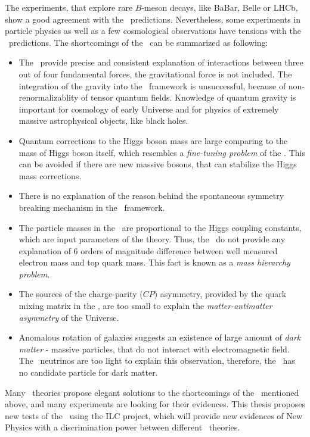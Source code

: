 The experiments, that explore rare $B$-meson decays, like BaBar, Belle or LHCb, show a good agreement with the \sm\ predictions. 
Nevertheless, some experiments in particle physics as well as a few cosmological observations have tensions with the \sm\ predictions.
The shortcomings of the \sm\ can be summarized as following:
\begin{itemize}
\item The \sm\ provide precise and consistent explanation of interactions between three out of four fundamental forces, the gravitational force is not included. The integration of the gravity into the \sm\ framework is unsuccessful, because of non-renormalizablity of tensor quantum fields. Knowledge of quantum gravity is important for cosmology of early Universe and for physics of extremely massive astrophysical objects, like black holes.
\item Quantum corrections to the Higgs boson mass are large comparing to the mass of Higgs boson itself, which resembles a \textit{fine-tuning problem} of the \sm. This can be avoided if there are new massive bosons, that can stabilize the Higgs mass corrections.
\item There is no explanation of the reason behind the spontaneous symmetry breaking mechanism in the \sm\ framework. 

\item The particle masses in the \sm\ are proportional to the Higgs coupling constants, which are input parameters of the theory. Thus, the \sm\ do not provide any explanation of 6 orders of magnitude difference between well measured electron mass and top quark mass. This fact is known as a \textit{mass hierarchy problem}.

\item The sources of the charge-parity ($CP$) asymmetry, provided by the quark mixing matrix in the \sm, are too small to explain the \textit{matter-antimatter asymmetry} of the Universe.
\item Anomalous rotation of galaxies suggests an existence of large amount of \textit{dark matter} - massive particles, that do not interact with electromagnetic field. The \sm\ neutrinos are too light to explain this observation, therefore, the \sm\ has no candidate particle for dark matter. 

\end{itemize}



Many \bsm\ theories propose elegant solutions to the shortcomings of the \sm\ mentioned above, and many experiments are looking for their evidences. 
This thesis proposes new tests of the \sm\ using the ILC project, which will provide new evidences of New Physics with a discrimination power between different \bsm\ theories.


